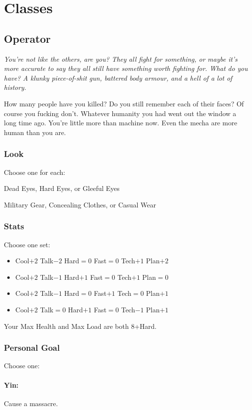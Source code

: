 \section{Classes}

\subsection{Operator}
{\itshape You're not like the others, are you? They all fight for
  something, or maybe it's more accurate to say they all still have
  something worth fighting for. What do you have? A klunky
  piece-of-shit gun, battered body armour, and a hell of a lot of
  history.

How many people have you killed? Do you still remember each of their
faces? Of course you fucking don't. Whatever humanity you had went out
the window a long time ago. You're little more than machine now. Even
the mecha are more human than you are.}

\subsubsection{Look}

Choose one for each:

Dead Eyes, Hard Eyes, or Gleeful Eyes

Military Gear, Concealing Clothes, or Casual Wear

\subsubsection{Stats}
Choose one set:
\begin{itemize}
\setlength\itemsep{0em}
\item Cool$+2$ Talk$-2$ Hard${=}0$ Fast${=}0$ Tech$+1$ Plan$+2$
\item Cool$+2$ Talk$-1$ Hard$+1$ Fast${=}0$ Tech$+1$ Plan${=}0$
\item Cool$+2$ Talk$-1$ Hard${=}0$ Fast$+1$ Tech${=}0$ Plan$+1$
\item Cool$+2$ Talk${=}0$ Hard$+1$ Fast${=}0$ Tech$-1$ Plan$+1$
\end{itemize}

Your Max Health and Max Load are both 8+Hard.

\subsubsection{Personal Goal}
Choose one:
\paragraph{Yin:} Cause a massacre.

